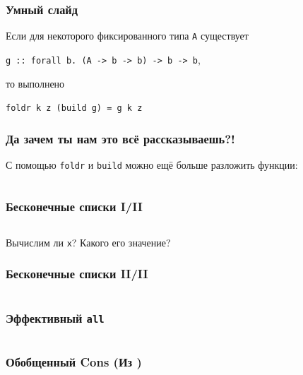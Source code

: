 \documentclass[
    aspectratio=169,
]{beamer}
\begin{document}
\begin{frame}[fragile]
    \frametitle{Умный слайд}

    \begin{theorem}
        Если для некоторого фиксированного типа \texttt{A} существует

        \texttt{g :: forall b. (A -> b -> b) -> b -> b},

        то выполнено

        \texttt{foldr k z (build g) = g k z}
    \end{theorem}

\end{frame}

\begin{frame}
    \frametitle{Да зачем ты нам это всё рассказываешь?!}

    С помощью \texttt{foldr} и \texttt{build} можно ещё больше разложить функции:
    \inputminted[firstline=61, lastline=66]{haskell}{Code.hs}

    \vspace{1em}
\end{frame}

\begin{frame}[fragile]
    \frametitle{Бесконечные списки I/II}

    \inputminted[firstline=68, lastline=76]{haskell}{Code.hs}

    Вычислим ли \texttt{x}?
    Какого его значение?

    \vspace{1em}
\end{frame}

\begin{frame}[fragile]
    \frametitle{Бесконечные списки II/II}

    \inputminted[firstline=78, lastline=82]{haskell}{Code.hs}

\end{frame}

\begin{frame}
    \frametitle{Эффективный \texttt{all}}

    \inputminted[firstline=84, lastline=93]{haskell}{Code.hs}

\end{frame}

\begin{frame}
    \frametitle{Обобщенный Cons (Из \cite{peytonjonesPlayingRulesRewriting2001})}

    \inputminted[firstline=95, lastline=106]{haskell}{Code.hs}

\end{frame}
\end{document}
